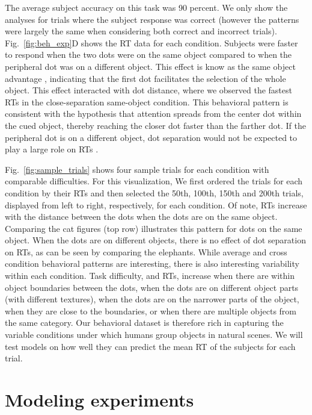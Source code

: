 \documentclass{article}
\begin{document}
The average subject accuracy on this task was 90 percent. We only show the analyses for trials where the subject response was correct (however the patterns were largely the same when considering both correct and incorrect trials). Fig.~\ref{fig:beh_exp}D shows the RT data for each condition. Subjects were faster to respond when the two dots were on the same object compared to when the peripheral dot was on a different object. This effect is know as the same object advantage \citep{egly1994shifting}, indicating that the first dot facilitates the selection of the whole object. This effect interacted with dot distance, where we observed the fastest RTs in the close-separation same-object condition. This behavioral pattern is consistent with the hypothesis that attention spreads from the center dot within the cued object, thereby reaching the closer dot faster than the farther dot. If the peripheral dot is on a different object, dot separation would not be expected to play a large role on RTs \citep{roelfsema2023solving}. 

Fig.~\ref{fig:sample_trials} shows four sample trials for each condition with comparable difficulties. For this visualization, We first ordered the trials for each condition by their RTs and then selected the 50th, 100th, 150th and 200th trials, displayed from left to right, respectively, for each condition. Of note, RTs increase with the distance between the dots when the dots are on the same object. Comparing the cat figures (top row) illustrates this pattern for dots on the same object. When the dots are on different objects, there is no effect of dot separation on RTs, as can be seen by comparing the elephants. While average and cross condition behavioral patterns are interesting, there is also interesting variability within each condition. Task difficulty, and RTs, increase when there are within object boundaries between the dots, when the dots are on different object parts (with different textures), when the dots are on the narrower parts of the object, when they are close to the boundaries, or when there are multiple objects from the same category. Our behavioral dataset is therefore rich in capturing the variable conditions under which humans group objects in natural scenes. We will test models on how well they can predict the mean RT of the subjects for each trial. 

\section{Modeling experiments}
\end{document}
